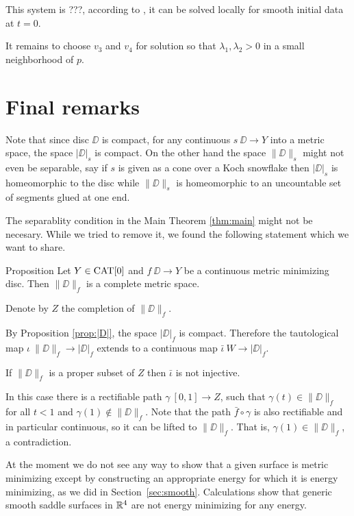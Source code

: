 \documentclass[a4paper,10pt]{amsart}
\begin{document}
This system is ???,
according to \cite[Theorem 3.6]{bressan}, it can be solved locally for smooth initial data at $t=0$.

It remains to choose $v_3$ and $v_4$ for solution so that $\lambda_1, \lambda_2>0$ in a small neighborhood of $p$.
\qeds


\section{Final remarks}

Note that since disc $\DD$ is compact, 
for any continuous $s\:\DD\to Y$ into a metric space,
the space $|\DD|_s$ is compact.
On the other hand the space $\|\DD\|_s$ might not even be separable,
say if $s$ is given as a cone over a Koch snowflake then 
$|\DD|_s$ is homeomorphic to the disc while $\|\DD\|_s$ is homeomorphic to an uncountable set of segments glued at one end.

The separablity condition in the Main Theorem \ref{thm:main}
might not be necesary.
While we tried to remove it, we found the following statement 
which we want to share.

\begin{thm}{Proposition}
Let $Y\in\mathop{\rm CAT}\nolimits[0]$ 
and 
$f\:\DD\to Y$ be a continuous metric minimizing disc.
Then $\|\DD\|_f$ is a complete metric space.
\end{thm}

Denote by $Z$ the completion of $\|\DD\|_f$.

By Proposition \ref{prop:|D|},
the space $|\DD|_f$ is compact.
Therefore the tautological map $\iota\:\|\DD\|_f\to |\DD|_f$ 
extends to a continuous map $\bar \iota\:W\to |\DD|_f$.

If $\|\DD\|_f$ is a proper subset of $Z$ 
then $\bar \iota$ is not injective.

In this case there is a rectifiable path $\gamma\:[0,1]\to Z$,
such that $\gamma(t)\in\|\DD\|_f$ for all $t<1$ and $\gamma(1)\notin \|\DD\|_f$.
Note that the path $\bar f\circ \gamma$ is also rectifiable and in particular continuous, so it can be lifted to $\|\DD\|_f$.
That is, $\gamma(1)\in \|\DD\|_f$, a contradiction.
\qeds

At the moment we do not see any way to show that a given surface is metric minimizing except by constructing an appropriate energy for which it is energy minimizing, as we did in Section~\ref{sec:smooth}.
Calculations show that generic smooth saddle surfaces in $\mathbb{R}^4$ are not energy minimizing for any energy.
\end{document}
